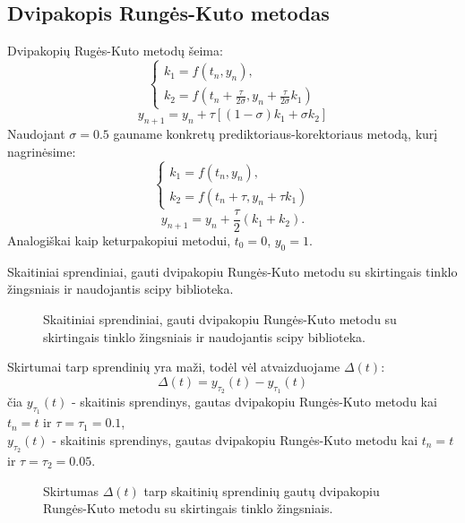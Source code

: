\documentclass[]{VUMIFTemplateClass}
\newcommand{\tone}{0.1}
\newcommand{\ttwo}{0.05}
\begin{document}
\subsection{Dvipakopis Rungės-Kuto metodas}
Dvipakopių Rugės-Kuto metodų šeima:
\begin{equation}
    \begin{cases}
        k_1 = f(t_n, y_n),\\
        k_2 = f(t_n + \frac{\tau}{2 \sigma}, y_n + \frac{\tau}{2 \sigma} k_1)
    \end{cases}
\end{equation}
\[ y_{n+1} = y_n + \tau [(1 - \sigma) k_1 + \sigma k_2]\]
Naudojant $\sigma = 0.5$ gauname konkretų prediktoriaus-korektoriaus metodą, kurį nagrinėsime:
\begin{equation}
    \begin{cases}
        k_1 = f(t_n, y_n),\\
        k_2 = f(t_n + \tau, y_n + \tau k_1)
    \end{cases}
\end{equation}
\[ y_{n+1} = y_n + \frac{\tau}{2} (k_1 + k_2). \]
Analogiškai kaip keturpakopiui metodui, $t_0 = 0$, $y_0 = 1$.
\begin{table}[H]
    \begin{center}
        
    \end{center}
    \caption{Skaitiniai sprendiniai, gauti dvipakopiu Rungės-Kuto metodu su skirtingais tinklo žingsniais ir naudojantis scipy biblioteka.}
\end{table}

\begin{figure}[H]
    \begin{center}
        
    \end{center}
    \caption{Skaitiniai sprendiniai, gauti dvipakopiu Rungės-Kuto metodu su skirtingais tinklo žingsniais ir naudojantis scipy biblioteka.}
\end{figure}

Skirtumai tarp sprendinių yra maži, todėl vėl atvaizduojame $\Delta(t)$:\\
\[ \Delta(t) = y_{\tau_2}(t) - y_{\tau_1}(t) \]
čia $y_{\tau_1}(t)$ - skaitinis sprendinys, gautas dvipakopiu Rungės-Kuto metodu kai $t_n = t$ ir $\tau = \tau_1 = \tone$,\\
$y_{\tau_2}(t)$ - skaitinis sprendinys, gautas dvipakopiu Rungės-Kuto metodu kai $t_n = t$ ir $\tau = \tau_2 = \ttwo$.

\begin{figure}[H]
    \begin{center}
        
    \end{center}
    \caption{Skirtumas $\Delta(t)$ tarp skaitinių sprendinių gautų dvipakopiu Rungės-Kuto metodu su skirtingais tinklo žingsniais.}
\end{figure}
\end{document}
